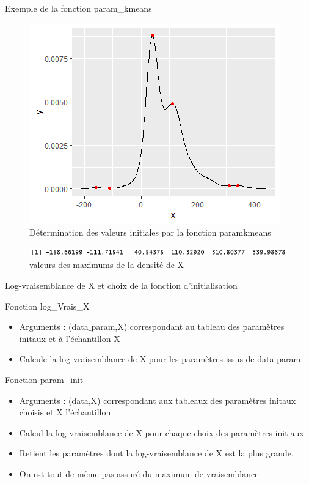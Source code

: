 \documentclass[11pt]{beamer}
\begin{document}
	\begin{frame}{Exemple de la fonction param\_kmeans}
	\scriptsize
		\begin{figure}[H]
			\centering
			\includegraphics[scale=0.45]{images/param_kmeans_image.png}
			\caption{Détermination des valeurs initiales par la fonction paramkmeans}
		\end{figure}
		\begin{figure}[H]
			\centering
			\includegraphics[scale=0.7]{images/valeurs_max.png}
			\caption{valeurs des maximums de la densité de X}
		\end{figure}
	\end{frame}

	\begin{frame}{Log-vraisemblance de X et choix de la fonction d'initialisation}
	\scriptsize
		\begin{block}{Fonction log\_Vrais\_X}
			\begin{itemize}
				\item Arguments : (data$\_$param,X) correspondant au tableau des paramètres initaux et à l'échantillon X
				\item Calcule la log-vraisemblance de X pour les paramètres issus de data$\_$param
			\end{itemize}
		\end{block}

		\begin{block}{Fonction param\_init}
			\begin{itemize}
				\item Arguments : (data,X) correspondant aux tableaux des paramètres initaux choisis et X l'échantillon
				\item Calcul la log vraisemblance de X pour chaque choix des paramètres initiaux
				\item Retient les paramètres dont la log-vraisemblance de X est la plus grande. 
				\item On est tout de même pas assuré du maximum de vraisemblance
			\end{itemize}
		\end{block}
	\end{frame}
	
\end{document}
